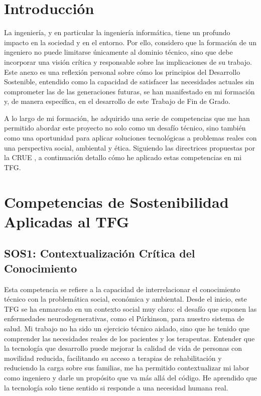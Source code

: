 \label{apendice:sostenibilidad}

\section{Introducción}
La ingeniería, y en particular la ingeniería informática, tiene un profundo impacto en la sociedad y en el entorno. Por ello, considero que la formación de un ingeniero no puede limitarse únicamente al dominio técnico, sino que debe incorporar una visión crítica y responsable sobre las implicaciones de su trabajo. Este anexo es una reflexión personal sobre cómo los principios del Desarrollo Sostenible, entendido como la capacidad de satisfacer las necesidades actuales sin comprometer las de las generaciones futuras, se han manifestado en mi formación y, de manera específica, en el desarrollo de este Trabajo de Fin de Grado.

A lo largo de mi formación, he adquirido una serie de competencias que me han permitido abordar este proyecto no solo como un desafío técnico, sino también como una oportunidad para aplicar soluciones tecnológicas a problemas reales con una perspectiva social, ambiental y ética. Siguiendo las directrices propuestas por la CRUE \cite{crue2012sostenibilidad}, a continuación detallo cómo he aplicado estas competencias en mi TFG.

\section{Competencias de Sostenibilidad Aplicadas al TFG}

\subsection{SOS1: Contextualización Crítica del Conocimiento}
Esta competencia se refiere a la capacidad de interrelacionar el conocimiento técnico con la problemática social, económica y ambiental. Desde el inicio, este TFG se ha enmarcado en un contexto social muy claro: el desafío que suponen las enfermedades neurodegenerativas, como el Párkinson, para nuestro sistema de salud. Mi trabajo no ha sido un ejercicio técnico aislado, sino que he tenido que comprender las necesidades reales de los pacientes y los terapeutas. Entender que la tecnología que desarrollo puede mejorar la calidad de vida de personas con movilidad reducida, facilitando su acceso a terapias de rehabilitación y reduciendo la carga sobre sus familias, me ha permitido contextualizar mi labor como ingeniero y darle un propósito que va más allá del código. He aprendido que la tecnología solo tiene sentido si responde a una necesidad humana real.

